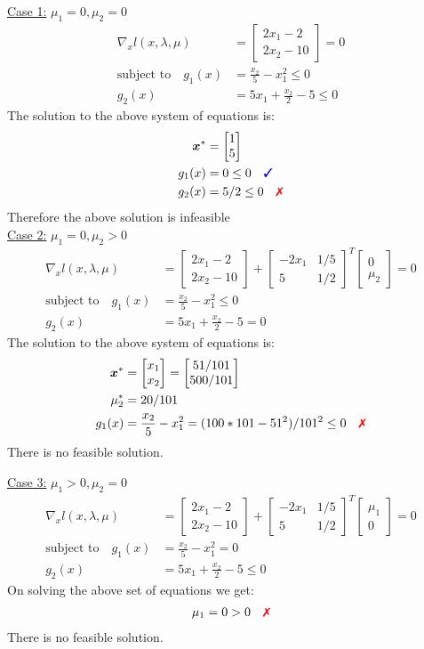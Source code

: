 \documentclass[a4paper,11pt]{article}
\newcommand{\V}[1]{\boldsymbol{#1}}
\newcommand{\mat}[1]{\begin{bmatrix}#1\end{bmatrix}}
\newcommand{\cmark}{{\color{blue}\text{\ding{51}}}}%
\newcommand{\xmark}{{\color{red}\text{\ding{55}}}}%
\begin{document}
\noindent\underline{Case 1:} $\mu_1=0, \mu_2=0$
\begin{align*}
 \nabla_x l(x,\lambda,\mu) &= \mat{2x_1 -2\\ 2x_2-10}=0\\
 \text{subject to}\quad g_1(x)&=\frac{x_2}{5}-x_1^2 \leq 0\\
 g_2(x)&=5x_1 +\frac{x_2}{2}-5\leq 0
\end{align*}
The solution to the above system of equations is:
\begin{align*}
 \V{x}^* &= \mat{1\\5}\\
 g_1(x)&= 0 \leq 0 \quad\cmark\\
 g_2(x)&= 5/2 \leq 0 \quad\xmark
\end{align*}
Therefore the above solution is infeasible\\

\noindent\underline{Case 2:} $\mu_1=0, \mu_2>0$
\begin{align*}
 \nabla_x l(x,\lambda,\mu) &= \mat{2x_1 -2\\ 2x_2-10} +\mat{-2x_1 & 1/5\\ 5& 1/2}^T\mat{0\\ \mu_2} =0\\
 \text{subject to}\quad g_1(x)&=\frac{x_2}{5}-x_1^2 \leq 0\\
 g_2(x)&=5x_1 +\frac{x_2}{2}-5= 0
\end{align*}
The solution to the above system of equations is:
\begin{align*}
 \V{x}^* &= \mat{x_1\\x_2} = \mat{51/101\\ 500/101}\\
 \mu_2^*& = 20/101\\
 g_1(x)&=\frac{x_2}{5}-x_1^2 = (100*101-51^2)/101^2 \leq 0 \quad \xmark
\end{align*}
There is no feasible solution.

\noindent\underline{Case 3:} $\mu_1>0,\mu_2=0$ 
\begin{align*}
 \nabla_x l(x,\lambda,\mu) &= \mat{2x_1 -2\\ 2x_2-10} +\mat{-2x_1 & 1/5\\ 5& 1/2}^T\mat{\mu_1\\ 0} =0\\
 \text{subject to}\quad g_1(x)&=\frac{x_2}{5}-x_1^2 = 0\\
 g_2(x)&=5x_1 +\frac{x_2}{2}-5\leq 0
\end{align*}
On solving the above set of equations we get:
\begin{align*}
 \mu_1 = 0 > 0 \quad \xmark
\end{align*}
There is no feasible solution.
\end{document}
